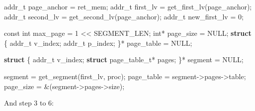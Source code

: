 \documentclass[]{article}
\newenvironment{Shaded}{}{}
\newcommand{\KeywordTok}[1]{\textcolor[rgb]{0.00,0.44,0.13}{\textbf{#1}}}
\newcommand{\DataTypeTok}[1]{\textcolor[rgb]{0.56,0.13,0.00}{#1}}
\newcommand{\DecValTok}[1]{\textcolor[rgb]{0.25,0.63,0.44}{#1}}
\newcommand{\NormalTok}[1]{#1}
\begin{document}
\begin{Shaded}
\begin{Highlighting}[]
\NormalTok{addr_t page_anchor = ret_mem;}
\NormalTok{addr_t first_lv = get_first_lv(page_anchor);}
\NormalTok{addr_t second_lv = get_second_lv(page_anchor);}
\NormalTok{addr_t new_first_lv = }\DecValTok{0}\NormalTok{;}

\DataTypeTok{const} \DataTypeTok{int}\NormalTok{ max_page = }\DecValTok{1}\NormalTok{ << SEGMENT_LEN;}
\DataTypeTok{int}\NormalTok{* page_size = NULL;}
\KeywordTok{struct}\NormalTok{ \{}
\NormalTok{      addr_t v_index;}
\NormalTok{      addr_t p_index;}
\NormalTok{\}* page_table = NULL;}

\KeywordTok{struct}\NormalTok{ \{}
\NormalTok{      addr_t v_index;}
\KeywordTok{      struct}\NormalTok{ page_table_t* pages;}
\NormalTok{\}* segment = NULL;}

\NormalTok{segment = get_segment(first_lv, proc);}
\NormalTok{page_table = segment->pages->table;}
\NormalTok{page_size = &(segment->pages->size);}
\end{Highlighting}
\end{Shaded}

And step 3 to 6:
\end{document}
